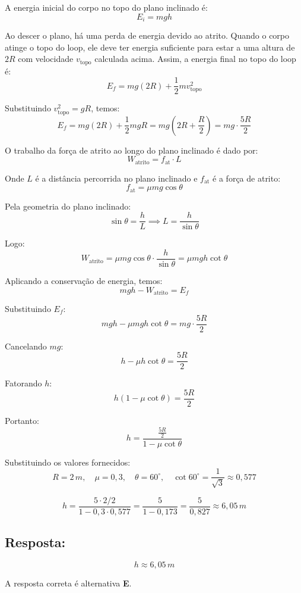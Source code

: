 \documentclass[a4paper,12pt]{article}
\begin{document}
\begin{flushleft}
A energia inicial do corpo no topo do plano inclinado é:
\[
E_i = m g h
\]

Ao descer o plano, há uma perda de energia devido ao atrito. Quando o corpo atinge o topo do loop, ele deve ter energia suficiente para estar a uma altura de $2R$ com velocidade $v_{\text{topo}}$ calculada acima. Assim, a energia final no topo do loop é:
\[
E_f = m g (2R) + \frac{1}{2} m v_{\text{topo}}^2
\]

Substituindo $v_{\text{topo}}^2 = gR$, temos:
\[
E_f = m g (2R) + \frac{1}{2} m g R = m g \left( 2R + \frac{R}{2} \right) = m g \cdot \frac{5R}{2}
\]

O trabalho da força de atrito ao longo do plano inclinado é dado por:
\[
W_{\text{atrito}} = f_{\text{at}} \cdot L
\]

Onde $L$ é a distância percorrida no plano inclinado e $f_{\text{at}}$ é a força de atrito:
\[
f_{\text{at}} = \mu m g \cos\theta
\]

Pela geometria do plano inclinado:
\[
\sin\theta = \frac{h}{L} \implies L = \frac{h}{\sin\theta}
\]

Logo:
\[
W_{\text{atrito}} = \mu m g \cos\theta \cdot \frac{h}{\sin\theta} = \mu m g h \cot\theta
\]

Aplicando a conservação de energia, temos:
\[
m g h - W_{\text{atrito}} = E_f
\]

Substituindo $E_f$:
\[
m g h - \mu m g h \cot\theta = m g \cdot \frac{5R}{2}
\]

Cancelando $m g$:
\[
h - \mu h \cot\theta = \frac{5R}{2}
\]

Fatorando $h$:
\[
h \left( 1 - \mu \cot\theta \right) = \frac{5R}{2}
\]

Portanto:
\[
h = \frac{\frac{5R}{2}}{1 - \mu \cot\theta}
\]

Substituindo os valores fornecidos:
\[
R = 2\,m, \quad \mu = 0{,}3, \quad \theta = 60^\circ, \quad \cot 60^\circ = \frac{1}{\sqrt{3}} \approx 0{,}577
\]

\[
h = \frac{5 \cdot 2 /2}{1 - 0{,}3 \cdot 0{,}577} = \frac{5}{1 - 0{,}173} = \frac{5}{0{,}827} \approx 6{,}05\,m
\]

\subsection*{Resposta:}

\[
\boxed{h \approx 6{,}05\,m}
\]

A resposta correta é alternativa \colorbox{green!50}{\textbf{E}}.

\end{flushleft}
\end{document}
